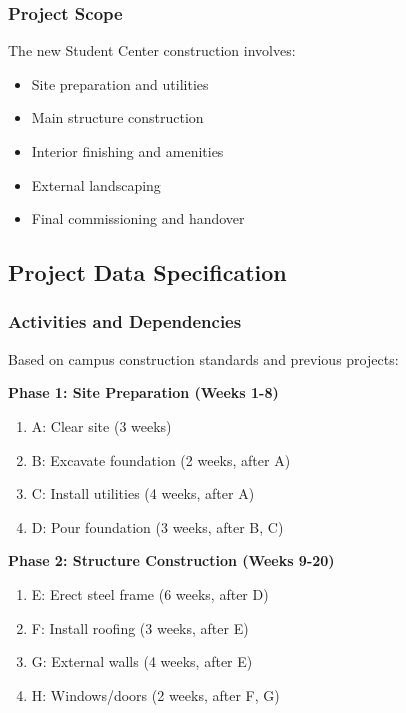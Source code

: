 \documentclass[
  letterpaper,
  DIV=11,
  numbers=noendperiod]{scrreprt}
\providecommand{\tightlist}{%
  \setlength{\itemsep}{0pt}\setlength{\parskip}{0pt}}
\begin{document}
\subsubsection{Project Scope}\label{project-scope}

The new Student Center construction involves:

\begin{itemize}
\tightlist
\item
  Site preparation and utilities
\item
  Main structure construction
\item
  Interior finishing and amenities
\item
  External landscaping
\item
  Final commissioning and handover
\end{itemize}

\subsection{Project Data
Specification}\label{project-data-specification}

\subsubsection{Activities and
Dependencies}\label{activities-and-dependencies}

Based on campus construction standards and previous projects:

\textbf{Phase 1: Site Preparation (Weeks 1-8)}

\begin{enumerate}
\def\labelenumi{\arabic{enumi}.}
\tightlist
\item
  A: Clear site (3 weeks)
\item
  B: Excavate foundation (2 weeks, after A)
\item
  C: Install utilities (4 weeks, after A)
\item
  D: Pour foundation (3 weeks, after B, C)
\end{enumerate}

\textbf{Phase 2: Structure Construction (Weeks 9-20)}

\begin{enumerate}
\def\labelenumi{\arabic{enumi}.}
\setcounter{enumi}{4}
\tightlist
\item
  E: Erect steel frame (6 weeks, after D)
\item
  F: Install roofing (3 weeks, after E)
\item
  G: External walls (4 weeks, after E)
\item
  H: Windows/doors (2 weeks, after F, G)
\end{enumerate}
\end{document}
